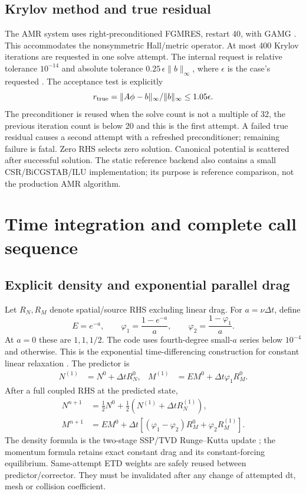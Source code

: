 \subsection{Krylov method and true residual}
The AMR system uses right-preconditioned FGMRES, restart 40, with GAMG
\citep{PETSc}. This accommodates the nonsymmetric Hall/metric operator.
At most 400 Krylov iterations are requested in one solve attempt. The
internal request is relative tolerance $10^{-14}$ and absolute tolerance
$0.25\,\epsilon\|b\|_\infty$, where $\epsilon$ is the case's requested
. The acceptance test is explicitly
\begin{equation}
 r_{\rm true}=\|A\phi-b\|_\infty/\|b\|_\infty\le1.05\epsilon.
\end{equation}
The preconditioner is reused when the solve count is not a multiple of 32,
the previous iteration count is below 20 and this is the first attempt.
A failed true residual causes a second attempt with a refreshed
preconditioner; remaining failure is fatal. Zero RHS selects zero solution.
Canonical potential is scattered after successful solution. The static
reference backend also contains a small CSR/BiCGSTAB/ILU implementation;
its purpose is reference comparison, not the production AMR algorithm.

\section{Time integration and complete call sequence}
\subsection{Explicit density and exponential parallel drag}
Let $R_N,R_M$ denote spatial/source RHS excluding linear drag. For
$a=\nu\Delta t$, define
\begin{equation}
 E=e^{-a},\qquad\varphi_1=\frac{1-e^{-a}}a,\qquad
 \varphi_2=\frac{1-\varphi_1}a.
\end{equation}
At $a=0$ these are $1,1,1/2$. The code uses fourth-degree small-$a$ series
below $10^{-4}$ and  otherwise. This is the exponential time-differencing construction for constant linear
relaxation \citep{CoxMatthews}. The predictor is
\begin{align}
 N^{(1)}&=N^0+\Delta t R_N^0,&
 M^{(1)}&=E M^0+\Delta t\varphi_1R_M^0.
\end{align}
After a full coupled RHS at the predicted state,
\begin{align}
 N^{n+1}&=\tfrac12N^0+\tfrac12(N^{(1)}+\Delta t R_N^{(1)}),\\
 M^{n+1}&=E M^0+\Delta t[(\varphi_1-\varphi_2)R_M^0+
                                    \varphi_2R_M^{(1)}].
\end{align}
The density formula is the two-stage SSP/TVD Runge--Kutta update
\citep{GottliebShu}; the momentum formula retains exact constant drag and
its constant-forcing equilibrium. Same-attempt ETD weights are safely
reused between predictor/corrector. They must be invalidated after any
change of attempted dt, mesh or collision coefficient.

